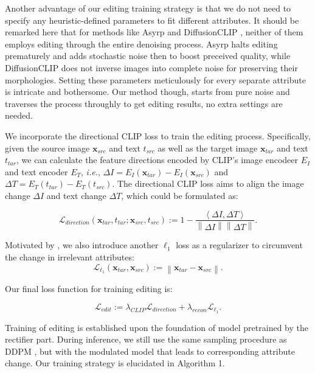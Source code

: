 \documentclass[letterpaper]{article} %
\begin{document}
Another advantage of our editing training strategy is that we do not need to specify any heuristic-defined parameters to fit different attributes. It should be remarked here that for methods like Asyrp \cite{kwon2022diffusion} and DiffusionCLIP \cite{kim2022diffusionclip}, neither of them employs editing through the entire denoising process. Asyrp halts editing prematurely and adds stochastic noise then to boost preceived quality, while DiffusionCLIP does not inverse images into complete noise for preserving their morphologies. Setting these parameters meticulously for every separate attribute is intricate and bothersome. Our method though, starts from pure noise and traverses the process throughly to get editing results, no extra settings are needed. 

We incorporate the directional CLIP loss \cite{gal2022stylegan} to train the editing process. Specifically, given the source image $\bm{x}_{src}$ and text $t_{src}$ as well as the target image $\bm{x}_{tar}$ and text $t_{tar}$, we can calculate the feature directions encoded by CLIP's image encodeer $E_I$ and text encoder $E_T$, \textit{i.e.}, $\Delta I = E_I(\bm{x}_{tar}) - E_I(\bm{x}_{src})$ and $\Delta T=E_T(t_{tar})-E_T(t_{src})$. The directional CLIP loss aims to align the image change $\Delta I$ and text change $\Delta T$, which could be formulated as: 

\begin{equation}
    \mathcal{L}_{direction}(\bm{x}_{tar}, t_{tar};\bm{x}_{src},t_{src}) := 1 - \frac{\left \langle \Delta I,\Delta T \right \rangle }{\left \| \Delta I \right \| \left \| \Delta T \right \| }.
\end{equation}

Motivated by \cite{kim2022diffusionclip}, we also introduce another $\ell_1$ loss as a regularizer to circumvent the change in irrelevant attributes:
\begin{equation}
    \mathcal{L}_{\ell_1}(\bm{x}_{tar}, \bm{x}_{src}) := \left \| \bm{x}_{tar} - \bm{x}_{src} \right \|.
\end{equation}

Our final loss function for training editing is:

\begin{equation}
    \mathcal{L}_{edit} := \lambda_{CLIP}\mathcal{L}_{direction} + \lambda_{recon} \mathcal{L}_{\ell_1}.
\end{equation}

Training of editing is established upon the foundation of model pretrained by the rectifier part. During inference, we still use the same sampling procedure as DDPM \cite{ho2020denoising}, but with the modulated model that leads to corresponding attribute change. Our training strategy is elucidated in Algorithm 1.
\end{document}
